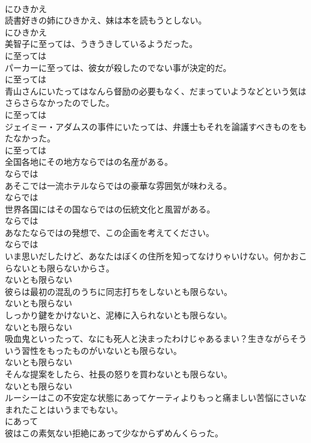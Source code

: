 \documentclass[8pt]{extreport}
\begin{document}
\begin{CJK}{UTF8}{min}
\\	にひきかえ
\\	読書好きの姉にひきかえ、妹は本を読もうとしない。	
\\	にひきかえ
\\	美智子に至っては、うきうきしているようだった。	
\\	に至っては
\\	パーカーに至っては、彼女が殺したのでない事が決定的だ。	
\\	に至っては
\\	青山さんにいたってはなんら督励の必要もなく、だまっていようなどという気はさらさらなかったのでした。	
\\	に至っては
\\	ジェイミー・アダムスの事件にいたっては、弁護士もそれを論議すべきものをもたなかった。	
\\	に至っては
\\	全国各地にその地方ならではの名産がある。	
\\	ならでは
\\	あそこでは一流ホテルならではの豪華な雰囲気が味わえる。	
\\	ならでは
\\	世界各国にはその国ならではの伝統文化と風習がある。	
\\	ならでは
\\	あなたならではの発想で、この企画を考えてください。	
\\	ならでは
\\	いま思いだしたけど、あなたはぼくの住所を知ってなけりゃいけない。何かおこらないとも限らないからさ。	
\\	ないとも限らない
\\	彼らは最初の混乱のうちに同志打ちをしないとも限らない。	
\\	ないとも限らない
\\	しっかり鍵をかけないと、泥棒に入られないとも限らない。	
\\	ないとも限らない
\\	吸血鬼といったって、なにも死人と決まったわけじゃあるまい？生きながらそういう習性をもったものがいないとも限らない。	
\\	ないとも限らない
\\	そんな提案をしたら、社長の怒りを買わないとも限らない。	
\\	ないとも限らない
\\	ルーシーはこの不安定な状態にあってケーティよりもっと痛ましい苦悩にさいなまれたことはいうまでもない。	
\\	にあって
\\	彼はこの素気ない拒絶にあって少なからずめんくらった。	

\end{CJK}
\end{document}
